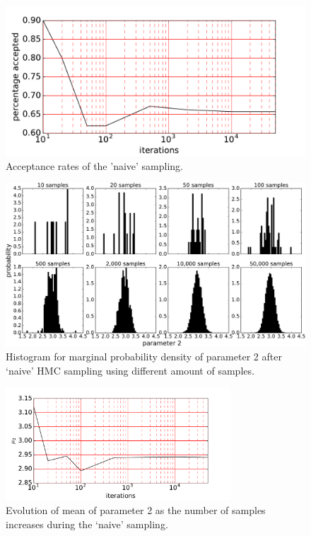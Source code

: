 \begin{figure}
	\centering
	\includegraphics[width=\textwidth]{figures/linear_systems/2d_naive/accepted.pdf}
	\caption{Acceptance rates of the 'naive' sampling.}
	\label{fig:linear_system.accepted}
\end{figure}

\begin{figure}
	\centering
	\includegraphics[width=\textwidth]{figures/linear_systems/2d_naive/histogram_p2.pdf}
	\caption{Histogram for marginal probability density of parameter 2 after `naive' HMC sampling using different amount of
	samples.}
	\label{fig:linear_system.histq2}
\end{figure}

\begin{figure}
	\centering
	\includegraphics[width=0.75\textwidth]{figures/linear_systems/2d_naive/means2.pdf}
	\caption{Evolution of mean of parameter 2 as the number of samples increases during the `naive' sampling.}
	\label{fig:linear_system.evolution_q2}
\end{figure}

